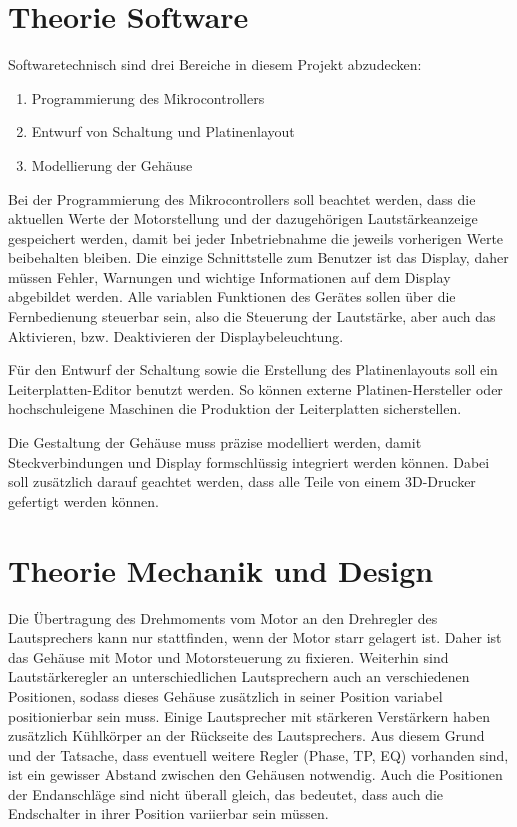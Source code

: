 \documentclass[11pt, titlepage]{report}
\begin{document}
		\section{Theorie Software}
		\label{sec:Theorie Software}
			Softwaretechnisch sind drei Bereiche in diesem Projekt abzudecken:
			\begin{enumerate}
				\item Programmierung des Mikrocontrollers
				\item Entwurf von Schaltung und Platinenlayout
				\item Modellierung der Gehäuse
			\end{enumerate} 

			Bei der Programmierung des Mikrocontrollers soll beachtet werden, dass die aktuellen Werte der Motorstellung und der dazugehörigen Lautstärkeanzeige gespeichert werden, damit bei jeder Inbetriebnahme die jeweils vorherigen Werte beibehalten bleiben. Die einzige Schnittstelle zum Benutzer ist das Display, daher müssen Fehler, Warnungen und wichtige Informationen auf dem Display abgebildet werden. Alle variablen Funktionen des Gerätes sollen über die Fernbedienung steuerbar sein, also die Steuerung der Lautstärke, aber auch das Aktivieren, bzw. Deaktivieren der Displaybeleuchtung.

			Für den Entwurf der Schaltung sowie die Erstellung des Platinenlayouts soll ein Leiterplatten-Editor benutzt werden. So können externe Platinen-Hersteller oder hochschuleigene Maschinen die Produktion der Leiterplatten sicherstellen.

			Die Gestaltung der Gehäuse muss präzise modelliert werden, damit Steckverbindungen und Display formschlüssig integriert werden können. Dabei soll zusätzlich darauf geachtet werden, dass alle Teile von einem 3D-Drucker gefertigt werden können.


		\section{Theorie Mechanik und Design}
		\label{sec:Design}
			Die Übertragung des Drehmoments vom Motor an den Drehregler des Lautsprechers kann nur stattfinden, wenn der Motor starr gelagert ist. Daher ist das Gehäuse mit Motor und Motorsteuerung zu fixieren. Weiterhin sind Lautstärkeregler an unterschiedlichen Lautsprechern auch an verschiedenen Positionen, sodass dieses Gehäuse zusätzlich in seiner Position variabel positionierbar sein muss. 
			\newline Einige Lautsprecher mit stärkeren Verstärkern haben zusätzlich Kühlkörper an der Rückseite des Lautsprechers. Aus diesem Grund und der Tatsache, dass eventuell weitere Regler (Phase, TP, EQ) vorhanden sind, ist ein gewisser Abstand zwischen den Gehäusen notwendig. Auch die Positionen der Endanschläge sind nicht überall gleich, das bedeutet, dass auch die Endschalter in ihrer Position variierbar sein müssen.
		\label{sec:Theorie Mechanik}
\end{document}
